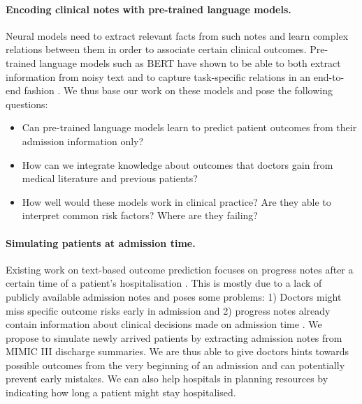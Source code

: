 \documentclass[11pt,a4paper]{article}
\begin{document}
\paragraph{Encoding clinical notes with pre-trained \hbox{language} models.} Neural models need to extract relevant facts from such notes and learn complex relations between them in order to associate certain clinical outcomes. Pre-trained language models such as BERT \cite{bert} have shown to be able to both extract information from noisy text and to capture task-specific relations in an end-to-end fashion \cite{tenney,explainbert}. We thus base our work on these models and pose the following questions:

\begin{itemize}
    \item Can pre-trained language models learn to predict patient outcomes from their admission information only?
    \item How can we integrate knowledge about outcomes that doctors gain from medical literature and previous patients?
    \item How well would these models work in clinical practice? Are they able to interpret common risk factors? Where are they failing?
\end{itemize}

\paragraph{Simulating patients at admission time.} Existing work on text-based outcome prediction focuses on progress notes after a certain time of a patient's hospitalisation \cite{huang-clinical-bert}. This is mostly due to a lack of publicly available admission notes and poses some problems: 1) Doctors might miss specific outcome risks early in admission and 2) progress notes already contain information about clinical decisions made on admission time \cite{whats-in-a-note}. We propose to simulate newly arrived patients by extracting admission notes from MIMIC III discharge summaries. We are thus able to give doctors hints towards possible outcomes from the very beginning of an admission and can potentially prevent early mistakes. We can also help hospitals in planning resources by indicating how long a patient might stay hospitalised.
\end{document}
